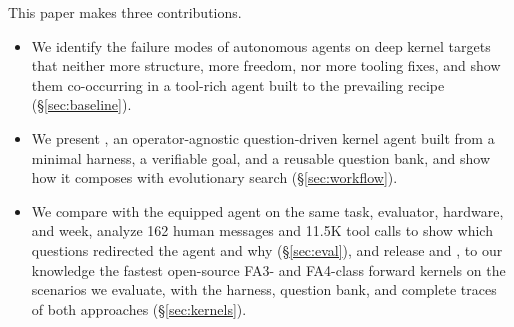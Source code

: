\noindent This paper makes three contributions.
\begin{itemize}[nosep,leftmargin=*]
\item We identify the failure modes of autonomous agents on deep kernel targets that neither more
structure, more freedom, nor more tooling fixes, and show them co-occurring in a tool-rich agent
built to the prevailing recipe (\S\ref{sec:baseline}).
\item We present \sys, an operator-agnostic question-driven kernel agent built from a minimal
harness, a verifiable goal, and a reusable question bank, and show how it composes with
evolutionary search (\S\ref{sec:workflow}).
\item We compare \sys with the equipped agent on the same task, evaluator, hardware, and week,
analyze 162 human messages and 11.5K tool calls to show which questions redirected the agent and
why (\S\ref{sec:eval}), and release \fathree and \fafour, to our knowledge the fastest open-source
FA3- and FA4-class forward kernels on the scenarios we evaluate, with the harness, question bank,
and complete traces of both approaches (\S\ref{sec:kernels}).
\end{itemize}
